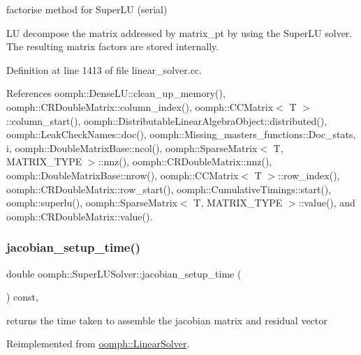 factorise method for Super\+LU (serial) 

LU decompose the matrix addressed by matrix\+\_\+pt by using the Super\+LU solver. The resulting matrix factors are stored internally. 

Definition at line 1413 of file linear\+\_\+solver.\+cc.



References oomph\+::\+Dense\+L\+U\+::clean\+\_\+up\+\_\+memory(), oomph\+::\+C\+R\+Double\+Matrix\+::column\+\_\+index(), oomph\+::\+C\+C\+Matrix$<$ T $>$\+::column\+\_\+start(), oomph\+::\+Distributable\+Linear\+Algebra\+Object\+::distributed(), oomph\+::\+Leak\+Check\+Names\+::doc(), oomph\+::\+Missing\+\_\+masters\+\_\+functions\+::\+Doc\+\_\+stats, i, oomph\+::\+Double\+Matrix\+Base\+::ncol(), oomph\+::\+Sparse\+Matrix$<$ T, M\+A\+T\+R\+I\+X\+\_\+\+T\+Y\+P\+E $>$\+::nnz(), oomph\+::\+C\+R\+Double\+Matrix\+::nnz(), oomph\+::\+Double\+Matrix\+Base\+::nrow(), oomph\+::\+C\+C\+Matrix$<$ T $>$\+::row\+\_\+index(), oomph\+::\+C\+R\+Double\+Matrix\+::row\+\_\+start(), oomph\+::\+Cumulative\+Timings\+::start(), oomph\+::superlu(), oomph\+::\+Sparse\+Matrix$<$ T, M\+A\+T\+R\+I\+X\+\_\+\+T\+Y\+P\+E $>$\+::value(), and oomph\+::\+C\+R\+Double\+Matrix\+::value().

\mbox{\label{classoomph_1_1SuperLUSolver_a9e9bdeac1f619319b931d1dea53a2d96}} 
\subsubsection{\texorpdfstring{jacobian\+\_\+setup\+\_\+time()}{jacobian\_setup\_time()}}
{\footnotesize\ttfamily double oomph\+::\+Super\+L\+U\+Solver\+::jacobian\+\_\+setup\+\_\+time (\begin{DoxyParamCaption}{ }\end{DoxyParamCaption}) const\hspace{0.3cm}{\ttfamily [inline]}, {\ttfamily [virtual]}}



returns the time taken to assemble the jacobian matrix and residual vector 



Reimplemented from \hyperlink{classoomph_1_1LinearSolver_a0fedfb9d9855d0e998c0e32140bc56d4}{oomph\+::\+Linear\+Solver}.



